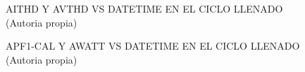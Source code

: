 \begin{figure}[H]
  \hfill
  \hfill
  \hfill
  \caption{AITHD Y AVTHD VS DATETIME EN EL CICLO LLENADO (Autoria propia)}
  \end{figure}
\begin{figure}[H]
  \hfill
  \hfill
  \hfill
  \caption{APF1-CAL Y AWATT VS DATETIME EN EL CICLO LLENADO (Autoria propia)}
  \end{figure}
